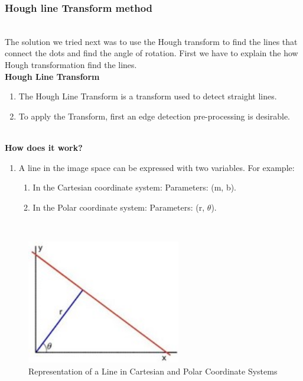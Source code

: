 \subsubsection{Hough line Transform method}
\\
The solution we tried next was to use the Hough transform to find the lines that connect the dots and find the angle of rotation. First we have to explain the how Hough transformation find the lines.\\

\textbf {Hough Line Transform}
\begin{enumerate}
    \item The Hough Line Transform is a transform used to detect straight lines.
    \item To apply the Transform, first an edge detection pre-processing is desirable.
\end{enumerate}\\

\textbf{How does it work?}

\begin{enumerate}
    \item A line in the image space can be expressed with two variables. For example:
    \begin{enumerate}
        \item In the Cartesian coordinate system: Parameters: (m, b).
        \item In the Polar coordinate system: Parameters: (r, $\theta$).
    \end{enumerate}
\end{enumerate}\\
\begin{figure}[h!]
     \centering
        \includegraphics[width=0.6\textwidth]{Picture1.jpg}
        \caption{Representation of a Line in Cartesian and Polar Coordinate Systems}
        \label{Representation of a Line in Cartesian and Polar Coordinate Systems}
\end{figure}


